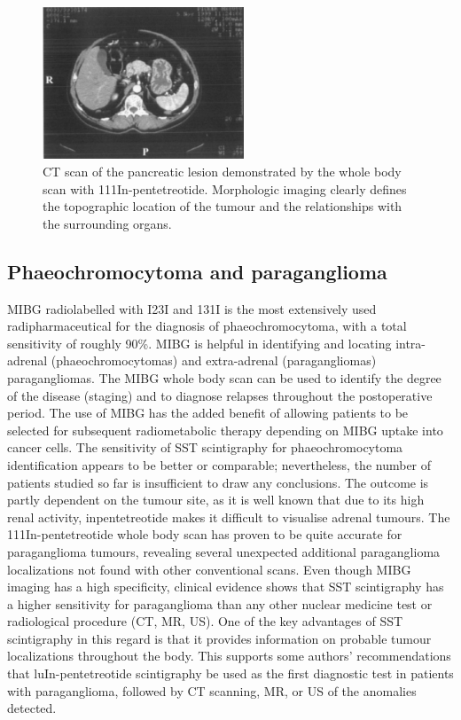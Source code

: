 \documentclass{article}
\begin{document}
\begin{multicols}{2}
\begin{figure}[H]
    \centering
    \includegraphics[width=6cm]{images/WhatsApp Image 2022-04-08 at 5.03.03 PM.jpeg}
    \caption{CT scan of the pancreatic lesion demonstrated by the whole body scan with 111In-pentetreotide. Morphologic imaging clearly defines the topographic location of the tumour and the relationships with the surrounding organs.}
    \label{fig:1}
\end{figure}

\subsection{Phaeochromocytoma and paraganglioma}

MIBG radiolabelled with I23I and 131I is the most extensively used radipharmaceutical for the diagnosis of phaeochromocytoma, with a total sensitivity of roughly 90\%. MIBG is helpful in identifying and locating intra-adrenal (phaeochromocytomas) and extra-adrenal (paragangliomas) paragangliomas. The MIBG whole body scan can be used to identify the degree of the disease (staging) and to diagnose relapses throughout the postoperative period. The use of MIBG has the added benefit of allowing patients to be selected for subsequent radiometabolic therapy depending on MIBG uptake into cancer cells. 
The sensitivity of SST scintigraphy for phaeochromocytoma identification appears to be better or comparable; nevertheless, the number of patients studied so far is insufficient to draw any conclusions. The outcome is partly dependent on the tumour site, as it is well known that due to its high renal activity, inpentetreotide makes it difficult to visualise adrenal tumours.
The 111In-pentetreotide whole body scan has proven to be quite accurate for paraganglioma tumours, revealing several unexpected additional paraganglioma localizations not found with other conventional scans. Even though MIBG imaging has a high specificity, clinical evidence shows that SST scintigraphy has a higher sensitivity for paraganglioma than any other nuclear medicine test or radiological procedure (CT, MR, US). One of the key advantages of SST scintigraphy in this regard is that it provides information on probable tumour localizations throughout the body. This supports some authors' recommendations that luIn-pentetreotide scintigraphy be used as the first diagnostic test in patients with paraganglioma, followed by CT scanning, MR, or US of the anomalies detected.


\end{multicols}
\end{document}
